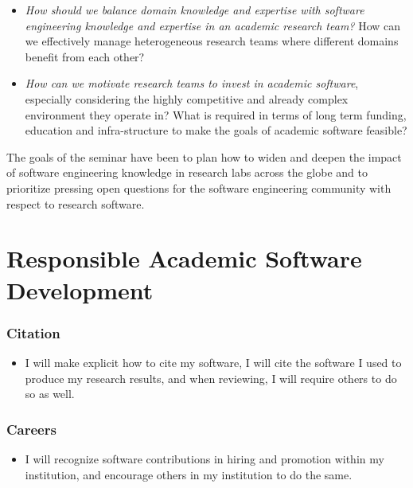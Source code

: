 \documentclass[a4paper,UKenglish]{dagman}
\renewcommand{\paragraph}[1]{\subsubsection*{#1}\xspace}
\begin{document}
\begin{itemize}
\item \emph{How should we balance domain knowledge and expertise with software engineering knowledge and expertise in an academic research team?} How can we effectively manage heterogeneous research teams where different domains benefit from each other?   
\item \emph{How can we motivate research teams to invest in academic software}, especially considering the highly competitive and already complex environment they operate in?
What is required in terms of long term funding, education and infra-structure to make the goals of academic software feasible?
\end{itemize}

The goals of the seminar have been to plan how to widen and deepen the impact of software engineering knowledge in research labs across the globe and to prioritize pressing open questions for the software engineering community with respect to research software.

\section{Responsible Academic Software Development}



\paragraph{Citation}
\begin{itemize}
\item I will make explicit how to cite my software, I will cite the software I used to produce my research results, and when reviewing, I will require others to do so as well.
\end{itemize}

\paragraph{Careers}
\begin{itemize}
\item I will recognize software contributions in hiring and promotion within my institution, and encourage others in my institution to do the same.
\end{itemize}
\end{document}
